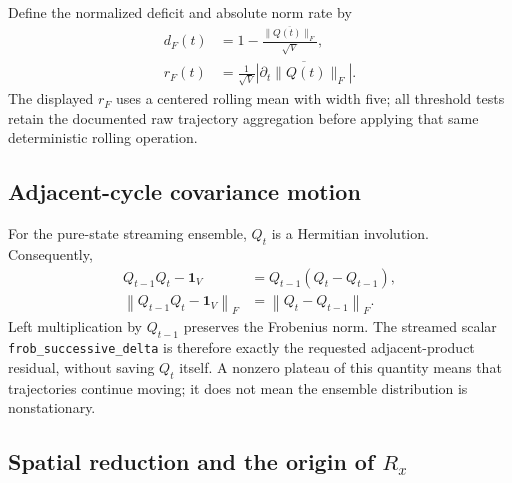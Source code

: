 \documentclass[aps,prb,twocolumn,nofootinbib,superscriptaddress,floatfix]{revtex4-2}
\newcommand{\Vsp}{V}
\newcommand{\Qcov}{Q}
\begin{document}
Define the normalized deficit and absolute norm rate by
\begin{align}
 d_F(t)&=1-
 \frac{\overline{\lVert\Qcov(t)\rVert_F}}{\sqrt{\Vsp}},
 \label{eq:frobdeficit}\\
 r_F(t)&=\frac{1}{\sqrt{\Vsp}}
 \overline{\left|\partial_t\lVert\Qcov(t)\rVert_F\right|}.
 \label{eq:frobrate}
\end{align}
The displayed $r_F$ uses a centered rolling mean with width five; all threshold
tests retain the documented raw trajectory aggregation before applying that
same deterministic rolling operation.

\subsection{Adjacent-cycle covariance motion}

For the pure-state streaming ensemble, $\Qcov_t$ is a Hermitian involution.
Consequently,
\begin{align}
 \Qcov_{t-1}\Qcov_t-\mathbf{1}_{\Vsp}
 &=\Qcov_{t-1}(\Qcov_t-\Qcov_{t-1}),\nonumber\\
 \left\lVert\Qcov_{t-1}\Qcov_t-\mathbf{1}_{\Vsp}\right\rVert_F
 &=\left\lVert\Qcov_t-\Qcov_{t-1}\right\rVert_F.
 \label{eq:productidentity}
\end{align}
Left multiplication by $\Qcov_{t-1}$ preserves the Frobenius norm.  The
streamed scalar \texttt{frob\_successive\_delta} is therefore exactly the
requested adjacent-product residual, without saving $\Qcov_t$ itself.  A
nonzero plateau of this quantity means that trajectories continue moving; it
does not mean the ensemble distribution is nonstationary.

\subsection{Spatial reduction and the origin of \texorpdfstring{$R_x$}{Rx}}
\end{document}
